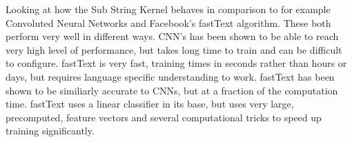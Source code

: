 
Looking at how the Sub String Kernel behaves in comparison to for example Convoluted Neural Networks and Facebook's fastText algorithm. These both perform very well in different ways. CNN's has been shown to be able to reach very high level of performance, but takes long time to train and can be difficult to configure. fastText is very fast, training times in seconds rather than hours or days, but requires language specific understanding to work. fastText has been shown to be similiarly accurate to CNNs, but at a fraction of the computation time. fastText uses a linear classifier in its base, but uses very large, precomputed, feature vectors and several computational tricks to speed up training significantly.
